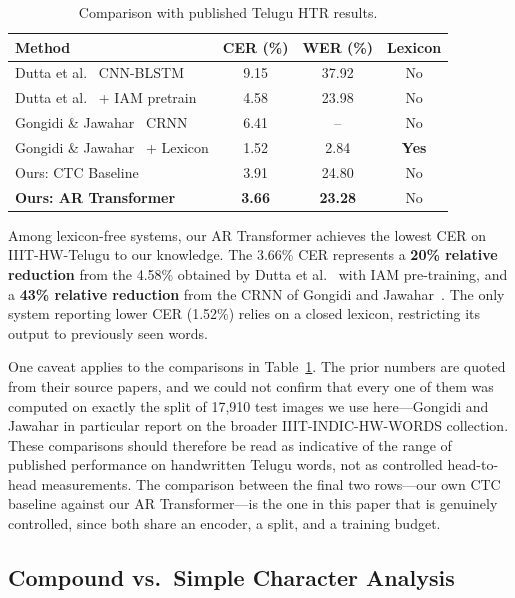 \documentclass[pdflatex,sn-mathphys-num]{sn-jnl}
\begin{document}
\begin{table}[t]
\centering
\caption{Comparison with published Telugu HTR results.}
\label{tab:comparison}
\begin{tabular}{lccc}
\toprule
\textbf{Method} & \textbf{CER (\%)} & \textbf{WER (\%)} & \textbf{Lexicon} \\
\midrule
Dutta et al.~\cite{dutta2018} CNN-BLSTM & 9.15 & 37.92 & No \\
Dutta et al.~\cite{dutta2018} + IAM pretrain & 4.58 & 23.98 & No \\
Gongidi \& Jawahar~\cite{gongidi2021iiit} CRNN & 6.41 & -- & No \\
Gongidi \& Jawahar~\cite{gongidi2021iiit} + Lexicon & 1.52 & 2.84 & \textbf{Yes} \\
\midrule
Ours: CTC Baseline & 3.91 & 24.80 & No \\
\textbf{Ours: AR Transformer} & \textbf{3.66} & \textbf{23.28} & No \\
\bottomrule
\end{tabular}
\end{table}

Among lexicon-free systems, our AR Transformer achieves the lowest CER on IIIT-HW-Telugu to our knowledge. The 3.66\% CER represents a \textbf{20\% relative reduction} from the 4.58\% obtained by Dutta et al.~\cite{dutta2018} with IAM pre-training, and a \textbf{43\% relative reduction} from the CRNN of Gongidi and Jawahar~\cite{gongidi2021iiit}. The only system reporting lower CER (1.52\%) relies on a closed lexicon, restricting its output to previously seen words.

One caveat applies to the comparisons in Table~\ref{tab:comparison}. The prior numbers are quoted from their source papers, and we could not confirm that every one of them was computed on exactly the split of 17,910 test images we use here---Gongidi and Jawahar in particular report on the broader IIIT-INDIC-HW-WORDS collection. These comparisons should therefore be read as indicative of the range of published performance on handwritten Telugu words, not as controlled head-to-head measurements. The comparison between the final two rows---our own CTC baseline against our AR Transformer---is the one in this paper that is genuinely controlled, since both share an encoder, a split, and a training budget.

\subsection{Compound vs.\ Simple Character Analysis}\label{sec:results:compound}
\end{document}
